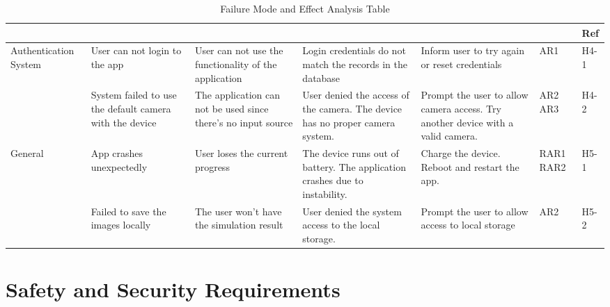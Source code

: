 \documentclass{article}
\begin{document}
\begin{landscape}
\begin{table}[h!]
\def\arraystretch{1.7}
\begin{tabularx}{1.2\textwidth} { |X|X|X|X|X
  | p{0.9cm}
  | p{0.9cm} | }
\hline
	\centering{Component} & \centering{Failure Mode} & \centering{Effects of Failure} & \centering{Causes of Failure} & \centering{Recommended Action} & \centering{SR} & Ref \\ \hline
     

     Authentication System & User can not login to the app & User can not use the functionality of the application  & Login credentials do not match the records in the database & Inform user to try again or reset credentials & AR1 & H4-1 \\ \cline{2-7}
     ~ & System failed to use the default camera with the device  & The application can not be used since there's no input source & 
    User denied the access of the camera.  \newline
    The device has no proper camera system.
     & 
     Prompt the user to allow camera access. \newline
     Try another device with a valid camera.
     & AR2 \newline AR3 & H4-2 \\ \hline     

    General & App crashes unexpectedly & User loses the current progress  &
    The device runs out of battery. \newline 
    The application crashes due to instability.  &
    Charge the device. \newline 
    Reboot and restart the app. & 
    RAR1 \newline
    RAR2
    &  H5-1 \\  \cline{2-7}
    ~ & Failed to save the images locally & The user won't have the simulation result & User denied the system access to the local storage. & Prompt the user to allow access to local storage & AR2 & H5-2 \\   
    \hline

\end{tabularx}
\caption{Failure Mode and Effect Analysis Table}
\label{FMEA Table}
\end{table}
\end{landscape}

\section{Safety and Security Requirements}
\end{document}
